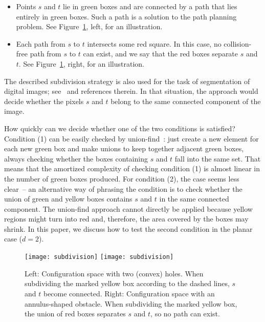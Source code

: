 \documentclass[a4paper,11pt]{article}
\begin{document}
\begin{itemize}
\item[(1)] Points $s$ and $t$ lie in green boxes and are connected by a path that lies entirely in green boxes. Such a path is a solution to the path planning problem.
See Figure~\ref{fig:problem_illustration}, left, for an illustration.
\item[(2)] Each path from $s$ to $t$ intersects some red square.
In this case, no collision-free path from $s$ to $t$ can exist, and
we say that the red boxes separate $s$ and $t$.
See Figure~\ref{fig:problem_illustration}, right, for an illustration.
\end{itemize}

The described subdivision strategy is also used for the task of segmentation of digital images; see~\cite{aizawa} and references therein.
In that situation, the approach would decide whether the pixels $s$ and $t$ belong to the same connected component of the image.

How quickly can we decide whether one of the two conditions is satisfied?
Condition (1) can be easily checked by union-find~\cite{tarjan}: just create a new element
for each new green box and make unions to keep together adjacent green boxes, 
always checking whether the boxes containing $s$ and $t$ fall into the same set. 
That means that the amortized complexity
of checking condition (1) is almost linear in the number of green boxes produced.
For condition (2), the case seems less clear~-- an alternative way of phrasing
the condition is to check whether the union of green and yellow boxes contains
$s$ and $t$ in the same connected component. The union-find approach cannot directly be applied
because yellow regions might turn into red and, therefore, the area covered by the boxes
may shrink.
In this paper, we discuss how to test the second condition in the planar case ($d=2$).

\begin{figure}[thb]
\centering
	\texttt{[image: subdivision]}
	\hspace{0.5cm}
	\texttt{[image: subdivision]}
	\caption{Left: Configuration space with two (convex) holes. 
	When subdividing the marked yellow box according to the dashed lines, $s$ and $t$ become connected.
	Right: Configuration space with an annulus-shaped obstacle. When subdividing the marked yellow box, the union
	of red boxes separates $s$ and $t$, so no path can exist.}
	\label{fig:problem_illustration}
\end{figure}
\end{document}
